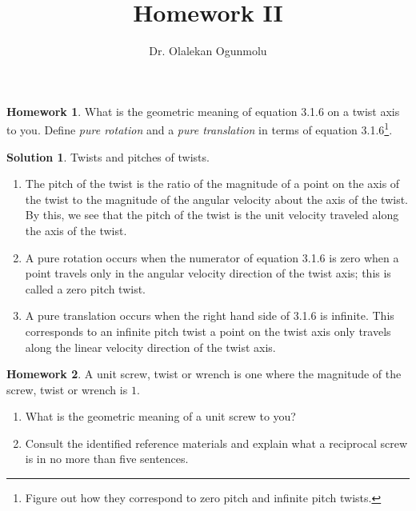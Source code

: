\documentclass[]{article}
\title{Homework II}
\author{Dr. Olalekan Ogunmolu}
\theoremstyle{definition}
\newtheorem{homework}{Homework}
\newtheorem{solution}{Solution}
\begin{document}
\maketitle


\noindent 
\begin{homework}
	What is the geometric meaning of equation 3.1.6 on a twist axis to you. Define \textit{pure rotation} and a \textit{pure translation} in terms of equation 3.1.6\footnote{Figure out how they correspond to zero pitch and infinite pitch twists.}. 
\end{homework} 

\begin{solution}
	Twists and pitches of twists.
	\begin{enumerate}
		\item The pitch of the twist is the ratio of the magnitude of a point on the axis of the twist to the magnitude of the angular velocity about the axis of the twist. By this, we see that the pitch of the twist is the unit velocity traveled along the axis of the twist.
		\item A pure rotation occurs when the numerator of equation 3.1.6 is zero \ie when a point travels only in the angular velocity direction of the twist axis; this is called a zero pitch twist.
		\item A pure translation occurs when the right hand side of 3.1.6 is infinite. This corresponds to an infinite pitch twist \ie a point on the twist axis only travels along the linear velocity direction of the twist axis.
	\end{enumerate}
\end{solution}

\noindent 
\begin{homework}
	A unit screw, twist or wrench is one where the magnitude of the screw, twist or wrench is $1$.  
	\begin{enumerate}
		\item  What is the geometric meaning of a unit screw to you? 
		\item Consult the identified reference materials and explain what a reciprocal screw is in no more than five sentences.
	\end{enumerate}
\end{homework}
\end{document}
